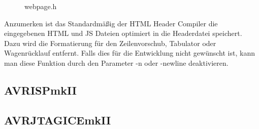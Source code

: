 \begin{figure}[H]

\caption{webpage.h}
\label{output}
\end{figure}

Anzumerken ist das Standardmäßig der HTML Header Compiler die eingegebenen HTML
und JS Dateien optimiert in die Headerdatei speichert. Dazu wird die
Formatierung für den Zeilenvorschub, Tabulator oder Wagenrücklauf entfernt.
Falls dies für die Entwicklung nicht gewünscht ist, kann man diese Funktion
durch den Parameter \textrm{-n oder -newline} deaktivieren.

\subsection{AVRISPmkII}


\subsection{AVRJTAGICEmkII}


